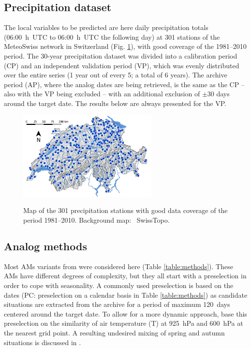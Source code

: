 \documentclass[alpha-refs]{wiley-article}
\begin{document}
\subsection{Precipitation dataset}
\label{sec:precipitation}

The local variables to be predicted are here daily precipitation totals (06:00~h~UTC to 06:00~h~UTC the following day) at 301 stations of the MeteoSwiss network in Switzerland (Fig. \ref{fig:stations}), with good coverage of the 1981--2010 period. The 30-year precipitation dataset was divided into a calibration period (CP) and an independent validation period (VP), which was evenly distributed over the entire series (1 year out of every 5; a total of 6 years). The archive period (AP), where the analog dates are being retrieved, is the same as the CP -- also with the VP being excluded -- with an additional exclusion of $\pm30$ days around the target date. The results below are always presented for the VP.

\begin{figure}
	\includegraphics[width=70mm]{figures/map-stations.jpg}\\
	\caption{Map of the 301 precipitation stations with good data coverage of the period 1981--2010. Background map: \textcopyright\ SwissTopo.}
	\label{fig:stations}
\end{figure}


\subsection{Analog methods}
\label{sec:ams}

Most AMs variants from \cite{Horton2018b} were considered here (Table \ref{table:methods}). These AMs have different degrees of complexity, but they all start with a preselection in order to cope with seasonality. A commonly used preselection is based on the dates (PC: preselection on a calendar basis in Table \ref{table:methods}) as candidate situations are extracted from the archive for a period of maximum 120~days centered around the target date. To allow for a more dynamic approach, \citet{BenDaoud2016} base this preselection on the similarity of air temperature (T) at 925~hPa and 600~hPa at the nearest grid point. A resulting undesired mixing of spring and autumn situations is discussed in \citet{Caillouet2016}. 
\end{document}
